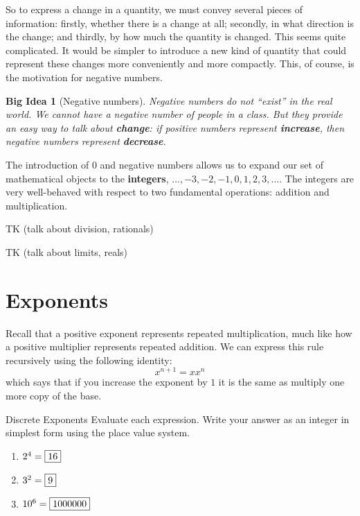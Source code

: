 \documentclass[a4paper,10pt]{report}
\newtheorem{bigidea}{Big Idea}
\begin{document}
So to express a change in a quantity, we must convey several pieces of information: firstly,
whether there is a change at all; secondly, in what direction is the change; and thirdly, by
how much the quantity is changed. This seems quite complicated. It would be simpler to
introduce a new kind of quantity that could represent these changes more conveniently and
more compactly. This, of course, is the motivation for negative numbers.

\begin{bigidea}[Negative numbers]
  Negative numbers do not ``exist'' in the real world. We cannot have a negative number of
  people in a class. But they provide an easy way to talk about \textbf{change}: if positive
  numbers represent \textbf{increase}, then negative numbers represent \textbf{decrease}.
\end{bigidea}

The introduction of \(0\) and negative numbers allows us to expand our set of mathematical
objects to the \textbf{integers}, \(\dots, -3, -2, -1, 0, 1, 2, 3, \dots\). The integers are
very well-behaved with respect to two fundamental operations: addition and multiplication.

TK (talk about division, rationals)

TK (talk about limits, reals)

\section{Exponents}

Recall that a positive exponent represents repeated multiplication, much like how a positive
multiplier represents repeated addition. We can express this rule recursively using the
following identity: \[
  x^{n+1} = xx^n
\] which says that if you increase the exponent by \(1\) it is the same as multiply one more
copy of the base.

\begin{problem}{Discrete Exponents}
 Evaluate each expression. Write your answer as an integer in simplest form
 using the place value system.

 \begin{enumerate}[\hspace{.5cm}a.]
  \item \(2^4=\Ans{16}\)
  \item \(3^2=\Ans{9}\)
  \item \(10^6=\Ans{1000000}\)
 \end{enumerate}
\end{problem}
\end{document}
